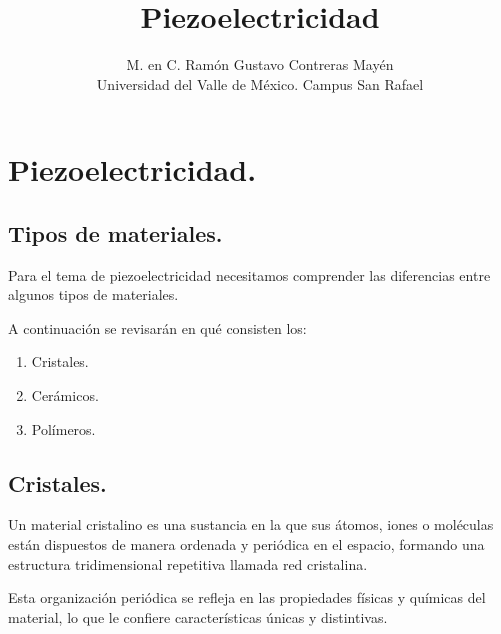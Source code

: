 \documentclass[12pt]{article}
\title{\vspace*{-2cm} Piezoelectricidad}
\author{M. en C. Ramón Gustavo Contreras Mayén \\ {\fontsize{14}{14}\selectfont Universidad del Valle de México. Campus San Rafael}}
\date{}
\begin{document}
\maketitle

\section{Piezoelectricidad.}

\subsection{Tipos de materiales.}

Para el tema de piezoelectricidad necesitamos comprender las diferencias entre algunos tipos de materiales.

A continuación se revisarán en qué consisten los:
\begin{enumerate}
\item Cristales.
\item Cerámicos.
\item Polímeros.
\end{enumerate}


\subsection{Cristales.}

Un material cristalino es una sustancia en la que sus átomos, iones o moléculas están dispuestos de manera ordenada y periódica en el espacio, formando una estructura tridimensional repetitiva llamada red cristalina.

Esta organización periódica se refleja en las propiedades físicas y químicas del material, lo que le confiere características únicas y distintivas.
\end{document}
